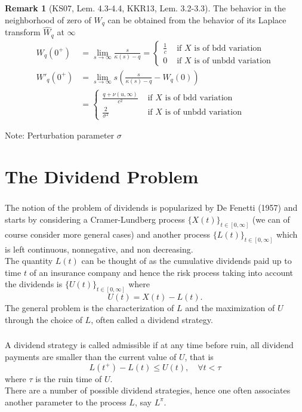 \documentclass[xcolor=pdftex,dvipsnames,table]{beamer}
\theoremstyle{definition}
\newtheorem*{rmk}{Remark}
\def\lt{\left}
\def\rt{\right}
\begin{document}
\begin{frame}
\frametitle{\insertsectionhead}
\begin{rmk} [KS07, Lem. 4.3-4.4, KKR13, Lem. 3.2-3.3]
The behavior in the neighborhood of zero of $W_q$ can be obtained from the behavior of its Laplace transform $\hat{W}_q$ at $\infty$
\begin{align}
\label{W0}
W_q (0^+) &= \lim_{s\rightarrow \infty} \frac{s}{\kappa(s)-q}= \begin{cases} \frac{1}{c} &\text{ if $X$ is of bdd variation}\\ 0 & 
\text{ if $X$ is of unbdd variation} \end{cases}\\
\nonumber  W'_q (0^+) &= \lim_{s\rightarrow \infty} s\lt( \frac{s}{\kappa(s)-q} - W_q(0) \rt) \\
\label{Wprime0} &= \begin{cases} \frac{q + \nu (u,\infty)}{c^2} &\text{ if $X$ is of bdd variation}\\ \frac{2}{\sigma^2} & \text{ if $X$ is of unbdd variation} \end{cases}
\end{align}
\end{rmk}
Note:  Perturbation parameter $\sigma$
\end{frame}


\section{The Dividend Problem}
\begin{frame}
\frametitle{\insertsectionhead}
The notion of the problem of dividends is popularized by De Fenetti (1957) and starts by considering a Cramer-Lundberg process $\{ X(t) \}_{t \in [0,\infty] }$ (we can of course consider more general cases) and another process $\{ L(t) \}_{t \in [0,\infty] }$ which is left continuous, nonnegative, and non decreasing.\\
\bigskip
The quantity $L(t)$ can be thought of as the cumulative dividends paid up to time $t$ of an insurance company and hence the risk process taking into account the dividends is $\{ U(t) \}_{t \in [0,\infty] }$ where
\[
U(t) = X(t) - L(t).
\]
The general problem is the characterization of $L$ and the maximization of $U$ through the choice of $L$, often called a dividend strategy.
\end{frame}

\begin{frame}
\frametitle{\insertsectionhead}
A dividend strategy is called admissible if at any time before ruin, all dividend payments are smaller than the current value of $U$, that is
\[L(t^+) - L(t) \leq U(t), \quad \forall t < \tau\]
where $\tau$ is the ruin time of $U$.\\
\bigskip
There are a number of possible dividend strategies, hence one often associates another parameter to the process $L$, say $L^{\pi}$.
\end{frame}
\end{document}
